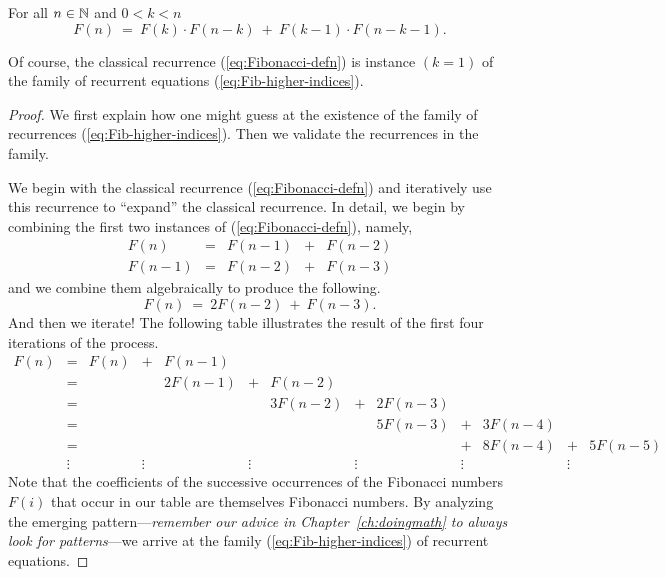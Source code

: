 \begin{prop}
\label{thm:Fib-higher-indices}
For all $n \in \mathbb{N}$ and $0 < k < n$
\begin{equation}
\label{eq:Fib-higher-indices}
F(n) \ = \ F(k) \cdot F(n-k) \ + \ F(k-1) \cdot F(n-k-1).
\end{equation}
\end{prop}

Of course, the classical recurrence (\ref{eq:Fibonacci-defn}) is instance $(k = 1)$ of the family of recurrent equations (\ref{eq:Fib-higher-indices}).

\begin{proof}
We first explain how one might guess at the existence of the family of recurrences (\ref{eq:Fib-higher-indices}).  Then we validate the recurrences in the family.

\smallskip

We begin with the classical recurrence (\ref{eq:Fibonacci-defn}) and iteratively use this recurrence to ``expand'' the classical recurrence.  In detail, we begin by combining the first two instances of (\ref{eq:Fibonacci-defn}), namely,
\[
\begin{array}{lcrrr}
F(n)   & = & F(n-1) & + & F(n-2) \\
F(n-1) & = & F(n-2) & + & F(n-3)
\end{array}
\]
and we combine them algebraically to produce the following.
\[ F(n) \ = \ 2 F(n-2) \ + \ F(n-3). \]
And then we iterate!  The following table illustrates the result of the first four iterations of the process.
\[
\begin{array}{ccrcrcrcrcrcr}
F(n) & = & F(n) & + & F(n-1) \\
     & = &      &   & 2 F(n-1) & + & F(n-2) \\
     & = &      &   &          &   & 3 F(n-2) & + & 2 F(n-3) \\
     & = &      &   &          &   &          &   & 5 F(n-3) & + & 3 F(n-4)  \\
     & = &      &   &          &   &          &   &          & + & 8
F(n-4) & + & 5 F(n-5)  \\
 & \vdots  &  & \vdots  &  &  \vdots &  & \vdots
 &  & \vdots  &   & \vdots  & 
\end{array}
\]
Note that the coefficients of the successive occurrences of the Fibonacci numbers $F(i)$ that occur in our table are themselves Fibonacci numbers.  By analyzing the emerging pattern---{\em remember our advice in Chapter~\ref{ch:doingmath} to always look for patterns}---we arrive at the family (\ref{eq:Fib-higher-indices}) of recurrent equations.


\end{proof}
